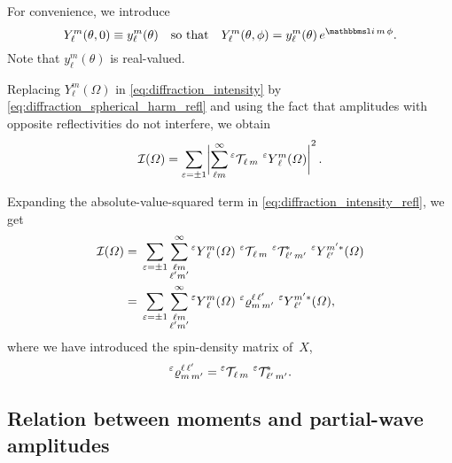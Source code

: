 For convenience, we introduce
\begin{equation}
  \label{eq:small_y_def}
  Y_\ell^m(\theta, 0)
  \equiv y_\ell^m(\theta)
  \quad\text{so that}\quad
  Y_\ell^m(\theta, \phi)
  = y_\ell^m(\theta)\, e^{\imag\, m\, \phi}.
\end{equation}
Note that $y_\ell^m(\theta)$ is real-valued.

Replacing $Y_\ell^m(\Omega)$ in \cref{eq:diffraction_intensity} by
\cref{eq:diffraction_spherical_harm_refl} and using the fact that
amplitudes with opposite reflectivities do not interfere, we obtain
\begin{equation}
  \label{eq:diffraction_intensity_refl}
  \mathcal{I}(\Omega)
  = \sum_{\refl = \pm 1} \Abs[3]{\sum_{\ell m}^\infty \prescript{\refl}{}{\mathcal{T\!}}_{\ell\, m}\, \prescript{\refl}{}{Y}_\ell^m(\Omega)}^2.
\end{equation}

Expanding the absolute-value-squared term in
\cref{eq:diffraction_intensity_refl}, we get
\begin{align}
  \mathcal{I}(\Omega)
  ={}& \sum_{\varepsilon = \pm 1} \sum_{\substack{\ell m \\ \ell' m'}}^\infty
  \prescript{\ensuremath{\varepsilon}}{}{Y}_\ell^m(\Omega)\,
  \prescript{\ensuremath{\varepsilon}}{}{\mathcal{T\!}}_{\ell\, m}\,
  \prescript{\ensuremath{\varepsilon}}{}{\mathcal{T\!}}_{\ell'\, m'}^*\,
  \prescript{\ensuremath{\varepsilon}}{}{Y}_{\ell'}^{m' *}(\Omega)
  \\
  \label{eq:diffraction_intensity_refl_spin-dens}
  ={}& \sum_{\varepsilon = \pm 1} \sum_{\substack{\ell m \\ \ell' m'}}^\infty
  \prescript{\ensuremath{\varepsilon}}{}{Y}_\ell^m(\Omega)\, \prescript{\ensuremath{\varepsilon}}{}{\varrho}^{\ell\, \ell'}_{m\, m'}\, \prescript{\ensuremath{\varepsilon}}{}{Y}_{\ell'}^{m' *}(\Omega),
\end{align}
where we have introduced the spin-density matrix of~$X$,
\begin{equation}
  \label{eq:diffraction_refl_spin-dens}
  \prescript{\ensuremath{\varepsilon}}{}{\varrho}^{\ell\, \ell'}_{m\, m'}
  = \prescript{\ensuremath{\varepsilon}}{}{\mathcal{T\!}}_{\ell\, m}\, \prescript{\ensuremath{\varepsilon}}{}{\mathcal{T\!}}_{\ell'\, m'}^*.
\end{equation}


\subsection{Relation between moments and partial-wave amplitudes}%
\label{sec:diffraction:moments_pw}

